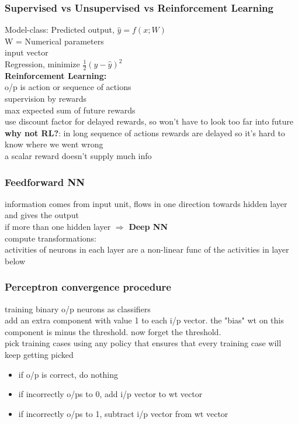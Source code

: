 \documentclass{beamer}
\begin{document}
\begin{frame}\frametitle{Supervised vs Unsupervised vs Reinforcement Learning}
	Model-class: Predicted output, $\hat{y} = f(x;W)$\\
	W = Numerical parameters\\
	input vector\\
	Regression, minimize $\frac{1}{2}(y-\hat{y})^2$\\
	\textbf{Reinforcement Learning:}\\
	o/p is action or sequence of actions\\
	supervision by rewards\\
	max expected sum of future rewards\\
	use discount factor for delayed rewards, so won't have to look too far into future\\
	\textbf{why not RL?}: in long sequence of actions rewards are delayed so it's hard to know where we went wrong\\
	a scalar reward doesn't supply much info
\end{frame}

\begin{frame}\frametitle{Feedforward NN}
	information comes from input unit, flows in one direction towards hidden layer and gives the output\\
	if more than one hidden layer $\Rightarrow$ \textbf{Deep NN}\\
	compute transformations:\\
	activities of neurons in each layer are a  non-linear func of the activities in layer below\\
	
\end{frame}

\begin{frame}\frametitle{Perceptron convergence procedure}
	training binary o/p neurons as classifiers\\
	add an extra component with value 1 to each i/p vector. the "bias" wt on this component is minus the threshold. now forget the threshold.\\
	pick training cases using any policy that ensures that every training case will keep getting picked\\
	\begin{itemize}
		\item if o/p is correct, do nothing
		\item if incorrectly o/ps to 0, add i/p vector to wt vector
		\item if incorrectly o/ps to 1, subtract i/p vector from wt vector
	\end{itemize}

\end{frame}
\end{document}
